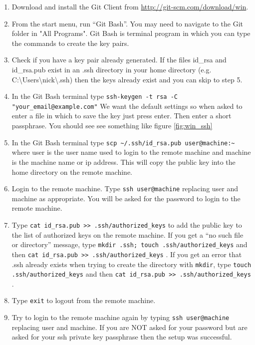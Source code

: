 \documentclass[11pt]{amsart}
\begin{document}
\begin{enumerate}
\item Download and install the Git Client from \href{http://git-scm.com/download/win}{http://git-scm.com/download/win}.
\item From the start menu, run ``Git Bash''. You may need to navigate to the Git folder in "All Programs". Git Bash is terminal program in which you can type the commands to create the key pairs.
\item Check if you have a key pair already generated. If the files id\_rsa and id\_rsa.pub exist in an .ssh directory in your home directory (e.g. C:\textbackslash Users\textbackslash nick\textbackslash .ssh) then the keys already exist and you can skip to step 5.
\item In the Git Bash terminal type {\tt ssh-keygen -t rsa -C "your\_email@example.com"} We want the default settings so when asked to enter a file in which to save the key just press enter. Then enter a short passphrase. You should see see something like figure \ref{fig:win_ssh}
\item In the Git Bash terminal type {\tt scp \textasciitilde/.ssh/id\_rsa.pub user@machine:\textasciitilde} where user is the user name used to login to the remote machine and machine is the machine name or ip address. This will copy the public key into the home directory on the remote machine.
\item Login to the remote machine. Type {\tt ssh user@machine} replacing user and machine as appropriate. You will be asked for the password to login to the remote machine. 
\item Type {\tt cat id\_rsa.pub >> .ssh/authorized\_keys} to add the public key to the list of authorized keys on the remote machine. If you get a ``no such file or directory'' message, type {\tt mkdir .ssh; touch .ssh/authorized\_keys} and then  {\tt cat id\_rsa.pub >> .ssh/authorized\_keys} . If you get an error that .ssh already exists when trying to create the directory with {\tt mkdir}, type {\tt touch .ssh/authorized\_keys} and then  {\tt cat id\_rsa.pub >> .ssh/authorized\_keys} .
\item Type {\tt exit} to logout from the remote machine. 
\item Try to login to the remote machine again by typing {\tt ssh user@machine} replacing user and machine. If you are NOT asked for your password but are asked for your ssh private key passphrase then the setup was successful.
\end{enumerate}
\end{document}
